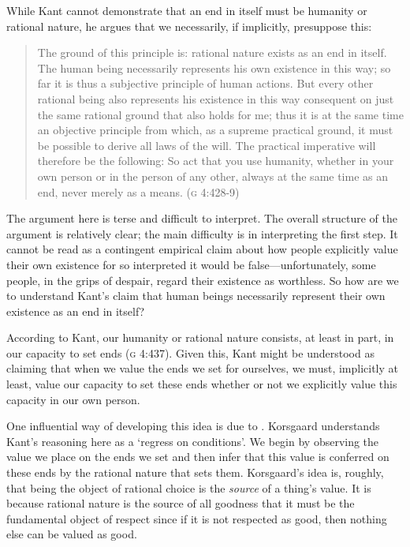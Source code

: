 \documentclass[12pt]{article}
\begin{document}
While Kant cannot demonstrate that an end in itself must be humanity or rational nature, he argues that we necessarily, if implicitly, presuppose this: 
\begin{quote}
	The ground of this principle is: rational nature exists as an end in itself. The human being necessarily represents his own existence in this way; so far it is thus a subjective principle of human actions. But every other rational being also represents his existence in this way consequent on just the same rational ground that also holds for me; thus it is at the same time an objective principle from which, as a supreme practical ground, it must be possible to derive all laws of the will. The practical imperative will therefore be the following: So act that you use humanity, whether in your own person or in the person of any other, always at the same time as an end, never merely as a means. (\textsc{g} 4:428-9) 
\end{quote}
The argument here is terse and difficult to interpret. The overall structure of the argument is relatively clear; the main difficulty is in interpreting the first step. It cannot be read as a contingent empirical claim about how people explicitly value their own existence for so interpreted it would be false---unfortunately, some people, in the grips of despair, regard their existence as worthless. So how are we to understand Kant's claim that human beings necessarily represent their own existence as an end in itself? 

According to Kant, our humanity or rational nature consists, at least in part, in our capacity to set ends (\textsc{g} 4:437). Given this, Kant might be understood as claiming that when we value the ends we set for ourselves, we must, implicitly at least, value our capacity to set these ends whether or not we explicitly value this capacity in our own person. 

One influential way of developing this idea is due to \citet{Korsgaard:1996md}. Korsgaard understands Kant's reasoning here as a `regress on conditions'. We begin by observing the value we place on the ends we set and then infer that this value is conferred on these ends by the rational nature that sets them. Korsgaard's idea is, roughly, that being the object of rational choice is the \emph{source} of a thing's value. It is because rational nature is the source of all goodness that it must be the fundamental object of respect since if it is not respected as good, then nothing else can be valued as good.
\end{document}
